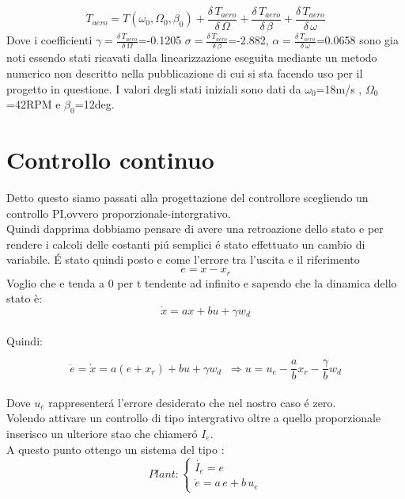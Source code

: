 \documentclass[a4paper,13pt]{article}
\begin{document}
\begin{equation}
T_{aero}=T(\omega_0,\Omega_0,\beta_0)+\frac{\delta \, T_{aero}}{\delta \, \Omega}+
\frac{\delta \, T_{aero}}{\delta \, \beta}+\frac{\delta \, T_{aero}}{\delta \, \omega}
\end{equation} 
Dove i coefficienti $\gamma=\frac{\delta \, T_{aero}}{\delta \, \Omega}$=-0.1205
$\sigma=\frac{\delta \, T_{aero}}{\delta \, \beta}$=-2.882,
$\alpha=\frac{\delta \, T_{aero}}{\delta \, \omega}$=0.0658
sono gia noti essendo stati ricavati dalla linearizzazione eseguita mediante un metodo numerico non descritto nella pubblicazione di cui si sta facendo uso per il progetto in questione.
I valori degli stati iniziali sono dati da $\omega_0$=18m/s , $\Omega_0$=42RPM e $\beta_0$=12deg.
\section{Controllo continuo}
Detto questo siamo passati alla progettazione del controllore scegliendo un controllo PI,ovvero proporzionale-intergrativo.\\
Quindi dapprima dobbiamo pensare di avere una retroazione dello stato e
per rendere i calcoli delle costanti pi\'u semplici \'e stato effettuato un cambio di variabile.
\'E stato quindi posto e come l'errore tra l'uscita e il riferimento
\begin{equation*}
	e=x-x_{r}          %
\end{equation*}
Voglio che e tenda a 0 per t tendente ad infinito e sapendo che la dinamica dello stato è:
\begin{equation*}
	\dot{x}=ax+bu+\gamma w_{d}    %
\end{equation*} \\
Quindi:

\begin{equation*}
	\dot{e}=\dot{x}=a(e+x_{r})+bu+\gamma w_{d}\,\,\:           %
	\Rightarrow u=u_e-\frac{a}{b} x_{r}-\frac{\gamma}{b} w_{d}
\end{equation*} \\
Dove $u_e$ rappresenter\'a l'errore desiderato che nel nostro caso \'e zero.\\
Volendo attivare un controllo di tipo intergrativo oltre a quello proporzionale
inserisco un ulteriore stao che chiamer\'o $I_e$.\\
A questo punto ottengo un sistema del tipo :
\[Plant	:
\begin{cases}
	
	\dot{I_{e}}= e \\
	\dot{e} = a\,e + b\,u_e
	
\end{cases}\]
\end{document}
